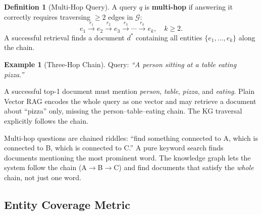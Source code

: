 \documentclass[12pt,a4paper]{article}
\theoremstyle{definition}
\newtheorem{definition}{Definition}[section]
\newtheorem{example}{Example}[section]
\theoremstyle{plain}
\theoremstyle{remark}
\begin{document}
\begin{definition}[Multi-Hop Query]
\label{def:multihop}
A query $q$ is \textbf{multi-hop} if answering it correctly requires
traversing $\geq 2$ edges in $\mathcal{G}$:
\[
  e_1 \xrightarrow{r_1} e_2 \xrightarrow{r_2} e_3
  \xrightarrow{r_3} \cdots \xrightarrow{r_k} e_k, \quad k \geq 2.
\]
A successful retrieval finds a document $d^*$ containing
all entities $\{e_1, \ldots, e_k\}$ along the chain.
\end{definition}

\begin{example}[Three-Hop Chain]
Query: \textit{``A person sitting at a table eating pizza.''}

\medskip
\begin{center}
\end{center}

\medskip
A successful top-1 document must mention
\emph{person}, \emph{table}, \emph{pizza}, and \emph{eating}.
Plain Vector RAG encodes the whole query as one vector and may
retrieve a document about ``pizza'' only, missing the person--table--eating
chain. The KG traversal explicitly follows the chain.
\end{example}

\begin{tcolorbox}[laymanbox]
Multi-hop questions are chained riddles: ``find something connected to A,
which is connected to B, which is connected to C.''
A pure keyword search finds documents mentioning the most prominent word.
The knowledge graph lets the system follow the chain (A$\to$B$\to$C)
and find documents that satisfy the \emph{whole} chain, not just one word.
\end{tcolorbox}

\subsection{Entity Coverage Metric}
\end{document}
